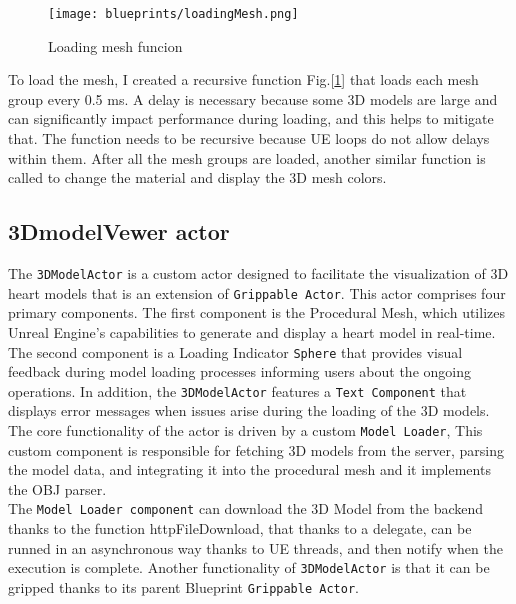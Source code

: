 

\begin{figure}[h]
    \centering
    \texttt{[image: blueprints/loadingMesh.png]}
    \caption{Loading mesh funcion}
    \label{fig:loadingMesh}
\end{figure}
\noindent
To load the mesh, I created a recursive function Fig.[\ref{fig:loadingMesh}] that loads each mesh group every 0.5 ms. A delay is necessary because some 3D models are large and can significantly impact performance during loading, and this helps to mitigate that. The function needs to be recursive because \ac{UE} loops do not allow delays within them.
After all the mesh groups are loaded, another similar function is called to change the material and display the 3D mesh colors.
\subsection{3DmodelVewer actor}
\noindent
The \texttt{3DModelActor} is a custom actor designed to facilitate the visualization of 3D heart models that is an extension of \texttt{Grippable Actor}. This actor comprises four primary components. The first component is the Procedural Mesh, which utilizes Unreal Engine's capabilities to generate and display a heart model in real-time. 
The second component is a Loading Indicator \texttt{Sphere} that provides visual feedback during model loading processes informing users about the ongoing operations. In addition, the \texttt{3DModelActor} features a \texttt{Text Component} that displays error messages when issues arise during the loading of the 3D models.\\
The core functionality of the actor is driven by a custom \texttt{Model Loader}, This custom component is responsible for fetching 3D models from the server, parsing the model data, and integrating it into the procedural mesh and it implements the OBJ parser.\\
The \texttt{Model Loader component} can download the 3D Model from the backend thanks to the function httpFileDownload, that thanks to a delegate, can be runned in an asynchronous way thanks to \ac{UE} threads, and then notify when the execution is complete.
Another functionality of \texttt{3DModelActor} is that it can be gripped thanks to its parent Blueprint \texttt{Grippable Actor}.



